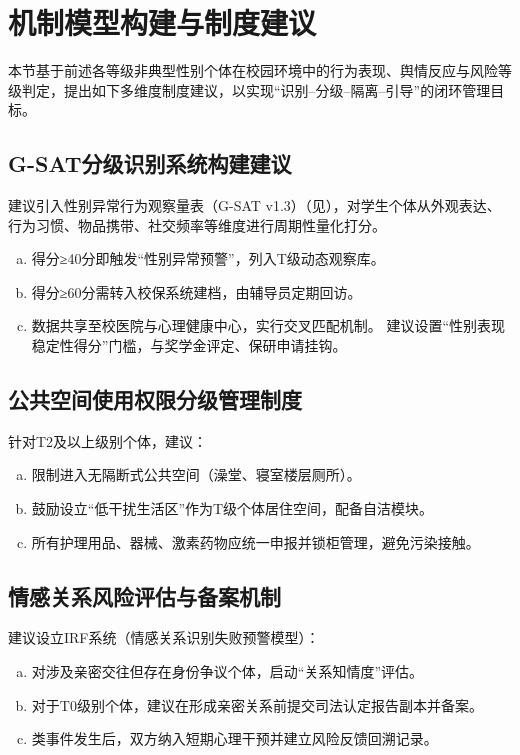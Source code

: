\documentclass[]{ctexrep}
\begin{document}
	\chapter{机制模型构建与制度建议}
	本节基于前述各等级非典型性别个体在校园环境中的行为表现、舆情反应与风险等级判定，提出如下多维度制度建议，以实现“识别–分级–隔离–引导”的闭环管理目标。
	
	\section{G-SAT分级识别系统构建建议}
	建议引入性别异常行为观察量表（G-SAT v1.3）（见\hyperref[附件1]{}），对学生个体从外观表达、行为习惯、物品携带、社交频率等维度进行周期性量化打分。
	\begin{enumerate}[a.]
		\item 得分≥40分即触发“性别异常预警”，列入T级动态观察库。
		
		\item 得分≥60分需转入校保系统建档，由辅导员定期回访。
		
		\item 数据共享至校医院与心理健康中心，实行交叉匹配机制。
		建议设置“性别表现稳定性得分”门槛，与奖学金评定、保研申请挂钩。
	\end{enumerate}
	\section{公共空间使用权限分级管理制度}
	针对T2及以上级别个体，建议：
	\begin{enumerate}[a.]
		\item 限制进入无隔断式公共空间（澡堂、寝室楼层厕所）。
		
		\item 鼓励设立“低干扰生活区”作为T级个体居住空间，配备自洁模块。
	
		\item 所有护理用品、器械、激素药物应统一申报并锁柜管理，避免污染接触。
	\end{enumerate}
	\section{情感关系风险评估与备案机制}
	建议设立IRF系统（情感关系识别失败预警模型）：
	\begin{enumerate}[a.]
		\item 对涉及亲密交往但存在身份争议个体，启动“关系知情度”评估。
		
		\item 对于T0级别个体，建议在形成亲密关系前提交司法认定报告副本并备案。
		
		\item \hyperref[3.4个体案例]{}类事件发生后，双方纳入短期心理干预并建立风险反馈回溯记录。
	\end{enumerate}
\end{document}
